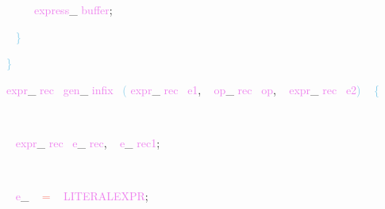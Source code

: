 \documentclass[8, usernames, dvipsnames]{beamer}
\begin{document}
\begin{frame}
\textcolor{White}{\   }
\textcolor{White}{\   }
\textcolor{OrangeRed}{	}
\textcolor{White}{\ }
\textcolor{Violet}{express}\textcolor{Sepia}{\_}
\textcolor{Violet}{buffer}\textcolor{Sepia}{;}

 \textcolor{White}{\   }
\textcolor{SkyBlue}{\} }

 
 \textcolor{SkyBlue}{\} }

 
 \textcolor{Violet}{expr}\textcolor{Sepia}{\_}
\textcolor{Violet}{rec}\textcolor{White}{\ }
\textcolor{Violet}{gen}\textcolor{Sepia}{\_}
\textcolor{Violet}{infix}\textcolor{White}{\ }
\textcolor{SkyBlue}{(}
\textcolor{Violet}{expr}\textcolor{Sepia}{\_}
\textcolor{Violet}{rec}\textcolor{White}{\ }
\textcolor{Violet}{e1}\textcolor{Sepia}{,}
\textcolor{White}{\ }
\textcolor{Violet}{op}\textcolor{Sepia}{\_}
\textcolor{Violet}{rec}\textcolor{White}{\ }
\textcolor{Violet}{op}\textcolor{Sepia}{,}
\textcolor{White}{\ }
\textcolor{Violet}{expr}\textcolor{Sepia}{\_}
\textcolor{Violet}{rec}\textcolor{White}{\ }
\textcolor{Violet}{e2}\textcolor{SkyBlue}{)}
\textcolor{White}{\ }
\textcolor{SkyBlue}{\{ }

 \textcolor{White}{\   }

 \textcolor{White}{\   }
\textcolor{Violet}{expr}\textcolor{Sepia}{\_}
\textcolor{Violet}{rec}\textcolor{White}{\ }
\textcolor{Violet}{e}\textcolor{Sepia}{\_}
\textcolor{Violet}{rec}\textcolor{Sepia}{,}
\textcolor{White}{\ }
\textcolor{Violet}{e}\textcolor{Sepia}{\_}
\textcolor{Violet}{rec1}\textcolor{Sepia}{;}

 \textcolor{White}{\   }

 \textcolor{White}{\   }
\textcolor{Violet}{e}\textcolor{Sepia}{\_}
\textcolor{White}{\ }
\textcolor{Salmon}{=}
\textcolor{White}{\ }
\textcolor{Violet}{LITERALEXPR}\textcolor{Sepia}{;}

 \end{frame}
\end{document}
